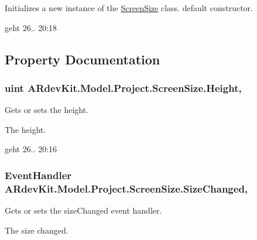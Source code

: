 Initializes a new instance of the \hyperlink{class_a_rdev_kit_1_1_model_1_1_project_1_1_screen_size}{Screen\-Size} class. default constructor. 

geht 26.. 20\-:18

\subsection{Property Documentation}
\hypertarget{class_a_rdev_kit_1_1_model_1_1_project_1_1_screen_size_ae289860edb4091d9e4467e023cf6351f}{
\subsubsection[{Height}]{\setlength{\rightskip}{0pt plus 5cm}uint A\-Rdev\-Kit.\-Model.\-Project.\-Screen\-Size.\-Height\hspace{0.3cm}{\ttfamily [get]}, {\ttfamily [set]}}}\label{class_a_rdev_kit_1_1_model_1_1_project_1_1_screen_size_ae289860edb4091d9e4467e023cf6351f}


Gets or sets the height. 

The height. 

geht 26.. 20\-:16\hypertarget{class_a_rdev_kit_1_1_model_1_1_project_1_1_screen_size_a62b2288aaa6d380b2e78d3603f5f2415}{
\subsubsection[{Size\-Changed}]{\setlength{\rightskip}{0pt plus 5cm}Event\-Handler A\-Rdev\-Kit.\-Model.\-Project.\-Screen\-Size.\-Size\-Changed\hspace{0.3cm}{\ttfamily [get]}, {\ttfamily [set]}}}\label{class_a_rdev_kit_1_1_model_1_1_project_1_1_screen_size_a62b2288aaa6d380b2e78d3603f5f2415}


Gets or sets the size\-Changed event handler. 

The size changed. 

